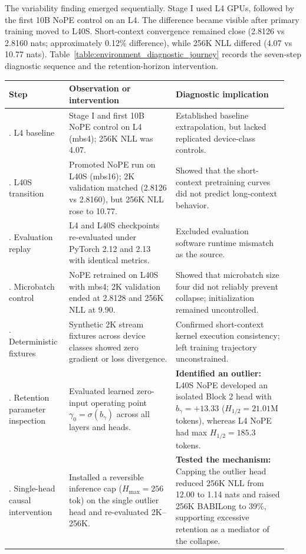 The variability finding emerged sequentially. Stage I used L4 GPUs, followed by the first 10B NoPE control on an L4. The difference became visible after primary training moved to L40S. Short-context convergence remained close (2.8126 vs 2.8160 nats; approximately 0.12\% difference), while 256K NLL differed (4.07 vs 10.77 nats). Table~\ref{table:environment_diagnostic_journey} records the seven-step diagnostic sequence and the retention-horizon intervention.

\begin{table}[!ht]
\centering
\small
\setlength{\tabcolsep}{4pt}
\begin{tabular}{>{\raggedright\arraybackslash}p{0.20\linewidth}>{\raggedright\arraybackslash}p{0.36\linewidth}>{\raggedright\arraybackslash}p{0.38\linewidth}}
\toprule
\textbf{Step} & \textbf{Observation or intervention} & \textbf{Diagnostic implication} \\
\midrule
1. L4 baseline & Stage I and first 10B NoPE control on L4 (mbs4); 256K NLL was 4.07. & Established baseline extrapolation, but lacked replicated device-class controls. \\
2. L40S transition & Promoted NoPE run on L40S (mbs16); 2K validation matched (2.8126 vs 2.8160), but 256K NLL rose to 10.77. & Showed that the short-context pretraining curves did not predict long-context behavior. \\
3. Evaluation replay & L4 and L40S checkpoints re-evaluated under PyTorch 2.12 and 2.13 with identical metrics. & Excluded evaluation software runtime mismatch as the source. \\
4. Microbatch control & NoPE retrained on L40S with mbs4; 2K validation ended at 2.8128 and 256K NLL at 9.90. & Showed that microbatch size four did not reliably prevent collapse; initialization remained uncontrolled. \\
5. Deterministic fixtures & Synthetic 2K stream fixtures across device classes showed zero gradient or loss divergence. & Confirmed short-context kernel execution consistency; left training trajectory unconstrained. \\
6. Retention parameter inspection & Evaluated learned zero-input operating point $\gamma_0 = \sigma(b_\gamma)$ across all layers and heads. & \textbf{Identified an outlier:} L40S NoPE developed an isolated Block 2 head with $b_\gamma = +13.33$ ($H_{1/2} = 21.01$M tokens), whereas L4 NoPE had max $H_{1/2} = 185.3$ tokens. \\
7. Single-head causal intervention & Installed a reversible inference cap ($H_{\max} = 256$ tok) on the single outlier head and re-evaluated 2K--256K. & \textbf{Tested the mechanism:} Capping the outlier head reduced 256K NLL from 12.00 to 1.14 nats and raised 256K BABILong to 39\%, supporting excessive retention as a mediator of the collapse. \\

\end{tabular}
\end{table}
